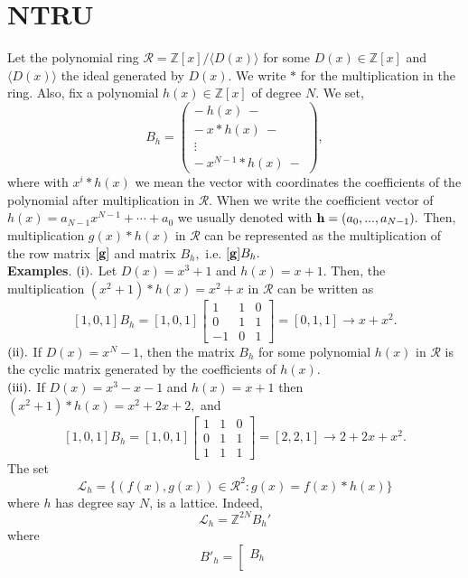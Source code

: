 \documentclass{amsart}
\numberwithin{equation}{section}
\begin{document}
{\section{NTRU}\label{sec:ntru}
Let the polynomial ring ${\mathcal{R}}={\mathbb{Z}}[x]/\langle D(x) \rangle$ for some $D(x)\in {\mathbb{Z}}[x]$ and $\langle D(x) \rangle$ the ideal generated by $D(x).$ We write $*$ for the multiplication in the ring. Also, fix a polynomial $h(x)\in {\mathbb{Z}}[x]$ of degree $N.$ We set, 
\begin{equation}\label{B_h}
B_h = \begin{pmatrix}
-\ h(x)\ - \\
-\ x*h(x)\ - \\
\vdots\\
-\ x^{N-1}*h(x)\ -
\end{pmatrix},
\end{equation}
where with $x^{i}*h(x)$ we mean the vector with coordinates the coefficients of the polynomial after multiplication in ${\mathcal{R}}.$ When we write the coefficient vector of $h(x)=a_{N-1}x^{N-1}+\cdots + a_0$ we usually denoted with ${\bf h}=(a_0,...,a_{N-1}).$
Then, multiplication $g(x)*h(x)$ in ${\mathcal{R}}$ can be represented as the multiplication of the row matrix $[{\bf g}]$ and matrix $B_h,$ i.e. $[{\bf g}]B_h.$\\
{\bf{Examples}}. $({\rm i}).$ Let $D(x)=x^3+1$ and $h(x)=x+1.$ Then, the multiplication $(x^2+1)*h(x) = x^2 + x$ in ${\mathcal{R}}$ can be written as 
$$[1,0,1]B_h=[1,0,1]\begin{bmatrix}
1&1&0\\
0&1&1\\
-1&0 &1
\end{bmatrix} = [0,1,1]\rightarrow x+x^2.$$
$({\rm ii}).$ If $D(x)=x^N-1$, then the matrix $B_h$ for some polynomial $h(x)$ in ${\mathcal{R}}$ is the cyclic matrix generated by the coefficients of $h(x).$\\
$({\rm iii}).$ If $D(x)=x^3-x-1$ and $h(x)=x+1$ then $(x^2+1)*h(x)=x^2+2x+2,$ and
$$[1,0,1]B_h=[1,0,1]\begin{bmatrix}
1&1&0\\
0&1&1\\
1&1 &1
\end{bmatrix} = [2,2,1]\rightarrow 2+2x+x^2.$$
The set 
$${\mathcal{L}}_h=\{(f(x),g(x))\in {\mathcal{R}}^2 : g(x)=f(x)*h(x)\}$$ where $h$ has degree say $N$, is a lattice. Indeed,
$${\mathcal{L}}_h={\mathbb{Z}}^{2N}B_h'$$ where 
$$B'_h=		\left[\begin{array}{c}
			 B_h  \\

\end{array}$$}
\end{document}
